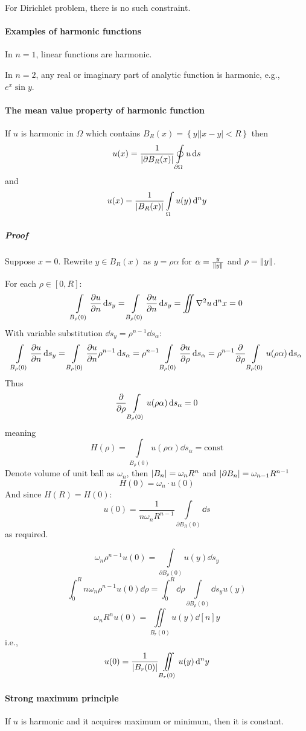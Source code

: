 For Dirichlet problem, there is no such constraint.

\paragraph{Examples of harmonic functions}
In $n=1$, linear functions are harmonic.

In $n=2$, any real or imaginary part of analytic function is harmonic, e.g., $e^x \sin y$.
\paragraph{The mean value property of harmonic function}
If $u$ is harmonic in $\Omega$ which contains $B_R(x) = \left\{ y| |x-y|<R \right\}$
then
$$u(x) = \frac{1}{\abs{\partial B_R(x)}} \oint\limits_{\partial \Omega} u \dd{s} $$
and
$$u(x) = \frac{1}{\abs{ B_R(x)}} \int\limits_{\Omega} u(y) \dd[n]{y} $$
\subparagraph{Proof}
Suppose $x=0$.
Rewrite $y\in B_R(x) $ as $y=\rho\alpha$ for $\alpha= \frac{y}{\norm{y}}$ and $\rho = \norm{y}$.

For each $\rho\in [0,R]$:
$$\int\limits_{B_\rho(0)} \pdv{u}{n} (\rho\alpha) \dd{s_y}=\int\limits_{B_\rho(0)} \pdv{u}{n} (y) \dd{s_y} = \iint \laplacian{u} \dd[n]{x} = 0$$
With variable substitution $\dd{s_y} = \rho^{n-1}\dd{s_\alpha}$:
$$\int\limits_{B_\rho(0)} \pdv{u}{n} (\rho\alpha) \dd{s_y}=\int\limits_{B_\rho(0)} \pdv{u}{n} (\rho\alpha) \rho^{n-1} \dd{s_\alpha}=\rho^{n-1} \int\limits_{B_\rho(0)} \pdv{u}{\rho} (\rho\alpha)  \dd{s_\alpha} = \rho^{n-1}  \pdv{\rho} \int\limits_{B_\rho(0)}  u(\rho\alpha)  \dd{s_\alpha}$$
Thus
$$\pdv{\rho} \int\limits_{B_\rho(0)}  u(\rho\alpha)  \dd{s_\alpha} = 0$$
meaning
$$H(\rho) = \int\limits_{B_\rho(0)}  u(\rho\alpha)  \dd{s_\alpha} = \text{const}$$
Denote volume of unit ball as $\omega_n$, then $\abs{B_n} = \omega_n R^n$ and $\abs{\partial B_n} = \omega_{n-1}R^{n-1}$ 
$$H(0) = \omega_n \cdot u(0)$$
And since $H(R) = H(0)$:
$$u(0) = \frac{1}{n\omega_n R^{n-1}} \int\limits_{\partial B_R(0)} \dd{s}$$
as required.

$$\omega_n \rho^{n-1} u(0) = \int\limits_{\partial B_\rho(0)} u(y) \dd{s_y}$$
$$\int_0^R n \omega_n \rho^{n-1} u(0) \dd{\rho} = \int_0^R \dd{\rho} \int\limits_{\partial B_\rho(0)}  \dd{s_y} u(y)$$
$$\omega_n R^n u(0) = \iint\limits_{B_r(0)} u(y) \dd[n]{y}$$
i.e.,
$$u(0) = \frac{1}{\abs{B_r(0)}} \iint\limits_{B_r(0)} u(y) \dd[n]{y}$$
	\paragraph{Strong maximum principle }
	If $u$ is harmonic and it acquires maximum or minimum, then it is constant.
